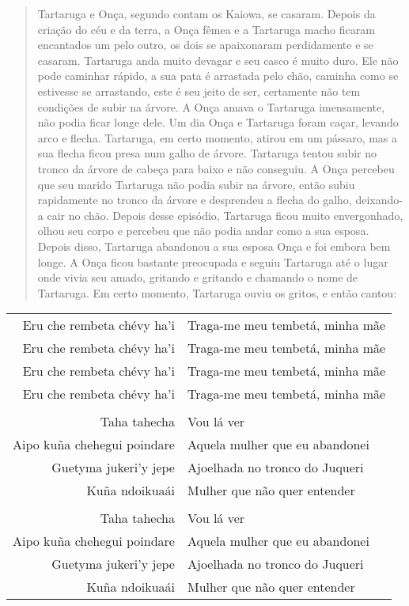 \begin{itemize}
\begin{quote}
Tartaruga e Onça, segundo contam os Kaiowa, se casaram. Depois da
criação do céu e da terra, a Onça fêmea e a Tartaruga macho ficaram
encantados um pelo outro, os dois se apaixonaram perdidamente e se
casaram. Tartaruga anda muito devagar e seu casco é muito duro. Ele não
pode caminhar rápido, a sua pata é arrastada pelo chão, caminha como se
estivesse se arrastando, este é seu jeito de ser, certamente não tem
condições de subir na árvore. A Onça amava o Tartaruga imensamente, não
podia ficar longe dele. Um dia Onça e Tartaruga foram caçar, levando
arco e flecha. Tartaruga, em certo momento, atirou em um pássaro, mas a
sua flecha ficou presa num galho de árvore. Tartaruga tentou subir no
tronco da árvore de cabeça para baixo e não conseguiu. A Onça percebeu
que seu marido Tartaruga não podia subir na árvore, então subiu
rapidamente no tronco da árvore e desprendeu a flecha do galho,
deixando-a cair no chão. Depois desse episódio, Tartaruga ficou muito
envergonhado, olhou seu corpo e percebeu que não podia andar como a sua
esposa. Depois disso, Tartaruga abandonou a sua esposa Onça e foi embora
bem longe. A Onça ficou bastante preocupada e seguiu Tartaruga até o
lugar onde vivia seu amado, gritando e gritando e chamando o nome de
Tartaruga. Em certo momento, Tartaruga ouviu os gritos, e então cantou:
\end{quote}


\begin{table}[]
\begin{tabular}{rl}
Eru che rembeta chévy ha'i          & Traga-me meu tembetá, minha mãe           \\
Eru che rembeta chévy ha'i          & Traga-me meu tembetá, minha mãe           \\
Eru che rembeta chévy ha'i  		& Traga-me meu tembetá, minha mãe \\
Eru che rembeta chévy ha'i 			& Traga-me meu tembetá, minha mãe   \\
                  &                     \\
Taha tahecha         & Vou lá ver           \\
Aipo kuña chehegui poindare         & Aquela mulher que eu abandonei           \\
Guetyma jukeri'y jepe  & Ajoelhada no tronco do Juqueri\footnotemark{} \\
Kuña ndoikuaái & Mulher que não quer entender   \\
                  &                     \\
Taha tahecha         & Vou lá ver           \\
Aipo kuña chehegui poindare         & Aquela mulher que eu abandonei           \\
Guetyma jukeri'y jepe  & Ajoelhada no tronco do Juqueri \\
Kuña ndoikuaái & Mulher que não quer entender   \\
\end{tabular}
\end{table}


\end{itemize}
